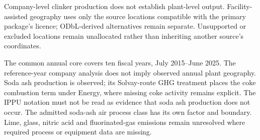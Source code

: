 Company-level clinker production does not establish plant-level output. Facility-assisted geography uses only the source locations compatible with the primary package's licence; ODbL-derived alternatives remain separate. Unsupported or excluded locations remain unallocated rather than inheriting another source's coordinates.

The common annual core covers ten fiscal years, July 2015--June 2025. The reference-year company analysis does not imply observed annual plant geography. Soda ash production is observed; its Solvay-route GHG treatment places the coke combustion term under Energy, where missing coke activity remains explicit. The IPPU notation must not be read as evidence that soda ash production does not occur. The admitted soda-ash air process class has its own factor and boundary. Lime, glass, nitric acid and fluorinated-gas emissions remain unresolved where required process or equipment data are missing.

